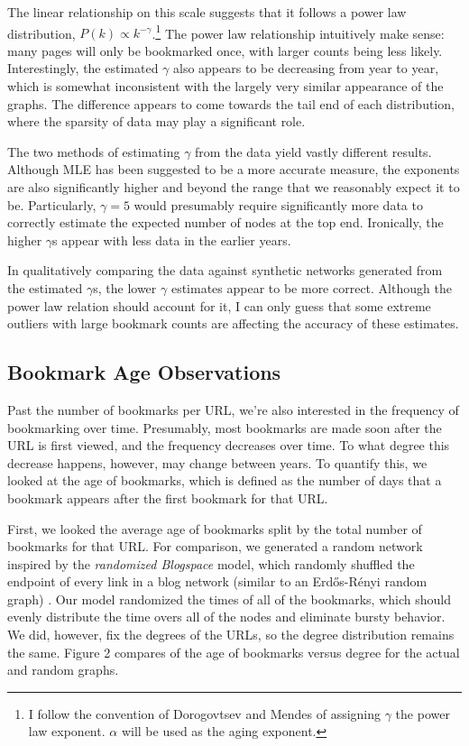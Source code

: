 \documentclass[11pt]{amsart}
\begin{document}
The linear relationship on this scale suggests that it follows a power law distribution, $P(k) \propto k^{-\gamma}$.\footnote{I follow the convention of Dorogovtsev and Mendes \cite{aging} of assigning $\gamma$ the power law exponent. $\alpha$ will be used as the aging exponent.} The power law relationship intuitively make sense: many pages will only be bookmarked once, with larger counts being less likely. Interestingly, the estimated $\gamma$ also appears to be decreasing from year to year, which is somewhat inconsistent with the largely very similar appearance of the graphs. The difference appears to come towards the tail end of each distribution, where the sparsity of data may play a significant role.

The two methods of estimating $\gamma$ from the data yield vastly different results. Although MLE has been suggested to be a more accurate measure, the exponents are also significantly higher and beyond the range that we reasonably expect it to be. Particularly, $\gamma = 5$ would presumably require significantly more data to correctly estimate the expected number of nodes at the top end. Ironically, the higher $\gamma$s appear with less data in the earlier years. 

In qualitatively comparing the data against synthetic networks generated from the estimated $\gamma$s, the lower $\gamma$ estimates appear to be more correct. Although the power law relation should account for it, I can only guess that some extreme outliers with large bookmark counts are affecting the accuracy of these estimates.

\subsection{Bookmark Age Observations}
Past the number of bookmarks per URL, we're also interested in the frequency of bookmarking over time. Presumably, most bookmarks are made soon after the URL is first viewed, and the frequency decreases over time. To what degree this decrease happens, however, may change between years. To quantify this, we looked at the age of bookmarks, which is defined as the number of days that a bookmark appears after the first bookmark for that URL.

First, we looked the average age of bookmarks split by the total number of bookmarks for that URL. For comparison, we generated a random network inspired by the \textit{randomized Blogspace} model, which randomly shuffled the endpoint of every link in a blog network (similar to an Erd\H{o}s-R\'{e}nyi random graph) \cite{bursty}. Our model randomized the times of all of the bookmarks, which should evenly distribute the time overs all of the nodes and eliminate bursty behavior. We did, however, fix the degrees of the URLs, so the degree distribution remains the same. Figure 2 compares of the age of bookmarks versus degree for the actual and random graphs.
\end{document}
